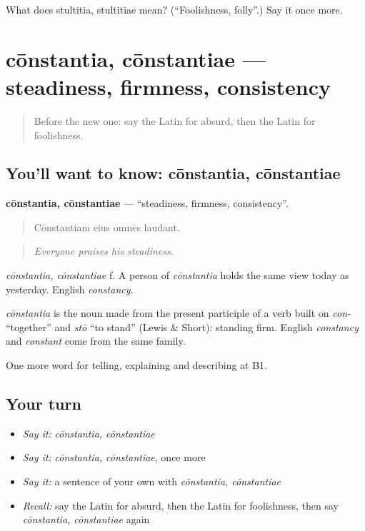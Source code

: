 \begin{tcolorbox}[breakable,colback=teal!4,colframe=teal!35!black,title={Before you move on}]
What does stultitia, stultitiae mean? (\textquotedblleft{}Foolishness, folly\textquotedblright{}.) Say it once more.
\end{tcolorbox}
\section[cōnstantia, cōnstantiae]{cōnstantia, cōnstantiae — steadiness, firmness, consistency}

\label{lesson:LA-C360-constantia}



\begin{quote}
Before the new one: say the Latin for absurd, then the Latin for foolishness.
\end{quote}

\subsection*{You'll want to know: cōnstantia, cōnstantiae}
\textbf{cōnstantia, cōnstantiae} — \textquotedblleft{}steadiness, firmness, consistency\textquotedblright{}.

\begin{quote}
Cōnstantiam eius omnēs laudant.
\end{quote}

\begin{quote}
\emph{Everyone praises his steadiness.}
\end{quote}

\emph{cōnstantia, cōnstantiae} f. A person of \emph{cōnstantia} holds the same view today as yesterday. English \emph{constancy}.

\begin{cousinweb}
\emph{cōnstantia} is the noun made from the present participle of a verb built on \emph{con-} \textquotedblleft{}together\textquotedblright{} and \emph{stō} \textquotedblleft{}to stand\textquotedblright{} (Lewis \& Short): standing firm. English \emph{constancy} and \emph{constant} come from the same family.
\end{cousinweb}

\begin{grammarlens}[title={What you've built}]
One more word for telling, explaining and describing at B1.
\end{grammarlens}

\subsection*{Your turn}
\begin{itemize}
\raggedright
  \item \emph{Say it:} \emph{cōnstantia, cōnstantiae}
  \item \emph{Say it:} \emph{cōnstantia, cōnstantiae}, once more
  \item \emph{Say it:} a sentence of your own with \emph{cōnstantia, cōnstantiae}
  \item \emph{Recall:} say the Latin for absurd, then the Latin for foolishness, then say \emph{cōnstantia, cōnstantiae} again
\end{itemize}


